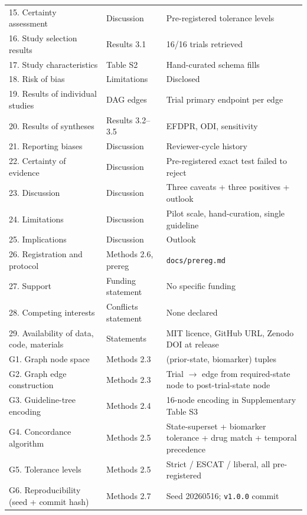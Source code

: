 \documentclass[11pt,a4paper]{article}
\begin{document}
\begin{longtable}{p{5.6cm}p{3.0cm}p{6.0cm}}
15. Certainty assessment & Discussion & Pre-registered tolerance levels \\
16. Study selection results & Results 3.1 & 16/16 trials retrieved \\
17. Study characteristics & Table S2 & Hand-curated schema fills \\
18. Risk of bias & Limitations & Disclosed \\
19. Results of individual studies & DAG edges & Trial primary endpoint per edge \\
20. Results of syntheses & Results 3.2--3.5 & EFDPR, ODI, sensitivity \\
21. Reporting biases & Discussion & Reviewer-cycle history \\
22. Certainty of evidence & Discussion & Pre-registered exact test failed to reject \\
23. Discussion & Discussion & Three caveats + three positives + outlook \\
24. Limitations & Discussion & Pilot scale, hand-curation, single guideline \\
25. Implications & Discussion & Outlook \\
26. Registration and protocol & Methods 2.6, prereg & \texttt{docs/prereg.md} \\
27. Support & Funding statement & No specific funding \\
28. Competing interests & Conflicts statement & None declared \\
29. Availability of data, code, materials & Statements & MIT licence, GitHub URL, Zenodo DOI at release \\
\midrule
G1. Graph node space & Methods 2.3 & (prior-state, biomarker) tuples \\
G2. Graph edge construction & Methods 2.3 & Trial $\to$ edge from required-state node to post-trial-state node \\
G3. Guideline-tree encoding & Methods 2.4 & 16-node encoding in Supplementary Table S3 \\
G4. Concordance algorithm & Methods 2.5 & State-superset + biomarker tolerance + drug match + temporal precedence \\
G5. Tolerance levels & Methods 2.5 & Strict / ESCAT / liberal, all pre-registered \\
G6. Reproducibility (seed + commit hash) & Methods 2.7 & Seed 20260516; \texttt{v1.0.0} commit \\
\bottomrule
\end{longtable}
\end{document}
